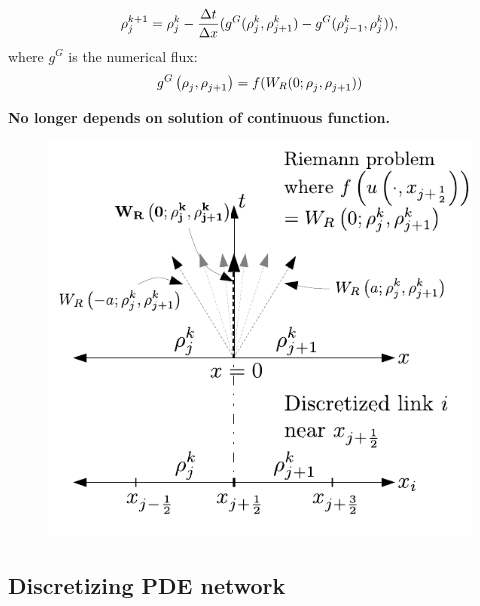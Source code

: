 \begin{frame}
    \begin{equation}
\rho_{j}^{k+1}=\rho_{j}^{k}-\frac{\Delta t}{\Delta x}(g^{G}(\rho_{j}^{k},\rho_{j+1}^{k})-g^{G}(\rho_{j-1}^{k},\rho_{j}^{k})),\label{eq:godscheme}
\end{equation}
where $g^{G}$ is the numerical flux:
\[
g^{G}\left(\rho_{j}^{},\rho_{j+1}^{}\right)=f(W_{R}(0;\rho_{j}^{},\rho_{j+1}^{}))
\]

\textbf{No longer depends on solution of continuous function.}

\begin{figure}
\centering
\includegraphics[width=0.45\columnwidth]{../figs-gen/dx-to-riemann}
\end{figure}

\end{frame}






\subsection{Discretizing PDE network} %
\label{sub:discretizing_pde_network}

